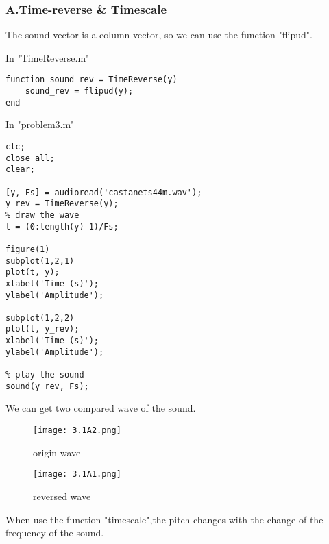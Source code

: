 \documentclass{article}
\begin{document}
\subsubsection*{A.Time-reverse \& Timescale}
The sound vector is a column vector, 
so we can use the function "flipud".\par
In "TimeReverse.m"
\begin{lstlisting}
function sound_rev = TimeReverse(y)
    sound_rev = flipud(y);
end
\end{lstlisting}
In "problem3.m"
\begin{lstlisting}
clc;
close all;
clear;

[y, Fs] = audioread('castanets44m.wav');
y_rev = TimeReverse(y);
% draw the wave
t = (0:length(y)-1)/Fs;

figure(1)
subplot(1,2,1)
plot(t, y);
xlabel('Time (s)');
ylabel('Amplitude');

subplot(1,2,2)
plot(t, y_rev);
xlabel('Time (s)');
ylabel('Amplitude');

% play the sound
sound(y_rev, Fs);
\end{lstlisting} 

\newpage
We can get two compared wave of the sound.
\begin{figure}[h]
    \begin{minipage}{0.45\textwidth}
        \centering
        \texttt{[image: 3.1A2.png]}
        \caption{origin wave}
    \end{minipage}
    \begin{minipage}{0.45\textwidth}
        \centering
        \texttt{[image: 3.1A1.png]}
        \caption{reversed wave}
    \end{minipage}
\end{figure}

\par
When use the function "timescale",the pitch changes with the change of the frequency of the sound.
\end{document}
